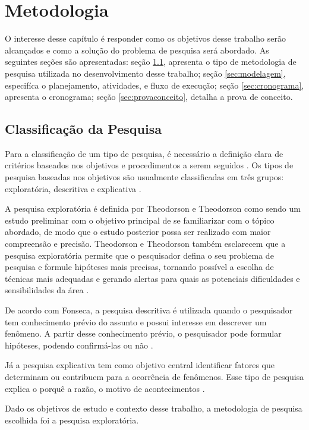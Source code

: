 \chapter[Metodologia]{Metodologia}

O interesse desse capítulo é responder como os objetivos desse trabalho serão
alcançados e como a solução do problema de pesquisa será abordado. As seguintes
seções são apresentadas: seção \ref{sec:classificacao}, apresenta o tipo de
metodologia de pesquisa utilizada no desenvolvimento desse trabalho; seção \ref{sec:modelagem}, especifíca o planejamento, atividades, e fluxo de execução;
seção \ref{sec:cronograma}, apresenta o cronograma; seção \ref{sec:provaconceito},
detalha a prova de conceito.

\section{Classificação da Pesquisa}
\label{sec:classificacao}

Para a classificação de um tipo de pesquisa, é necessário a definição clara de critérios baseados nos objetivos e procedimentos a serem seguidos \cite{gil2002}. Os tipos de pesquisa baseadas nos objetivos são usualmente classificadas em três grupos: exploratória, descritiva e explicativa \cite{gil2002}.

A pesquisa exploratória é definida por Theodorson e Theodorson como sendo um estudo preliminar com o objetivo principal de se familiarizar com o tópico abordado, de modo que o estudo posterior possa ser realizado com maior compreensão e precisão. Theodorson e Theodorson também esclarecem que a pesquisa exploratória permite que o pesquisador defina o seu problema de pesquisa e formule hipóteses mais precisas, tornando possível a escolha de técnicas mais adequadas e gerando alertas para quais as potenciais dificuldades e sensibilidades da área \cite{theodorson1970}.

De acordo com Fonseca, a pesquisa descritiva é utilizada quando o pesquisador tem conhecimento prévio do assunto e possui interesse em descrever um fenômeno. A partir desse conhecimento prévio, o pesquisador pode formular hipóteses, podendo confirmá-las ou não \cite{fonseca2002}.

Já a pesquisa explicativa tem como objetivo central identificar fatores que determinam ou contribuem para a ocorrência de fenômenos. Esse tipo de pesquisa explica o porquê a razão, o motivo de acontecimentos \cite{gil2002}.

Dado os objetivos de estudo e contexto desse trabalho, a metodologia de pesquisa escolhida foi a pesquisa exploratória.

